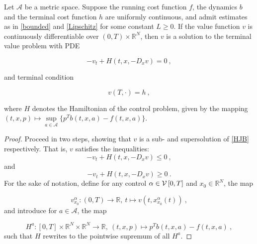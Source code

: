

\begin{theorem}
	\label{classical solution HJB}
	Let $ \mathcal{A} $ be a metric space. Suppose the running cost function $ f $, the dynamics $ b $ and the terminal cost function $ h $ are uniformly continuous, and admit estimates as in \eqref{bounded} and \eqref{Lipschitz} for some constant $ L \geq 0 $. If the value function $ v $ is continuously differentiable over $ \left( 0, T \right) \times \mathbb{R}^N $, then $ v $ is a solution to the terminal value problem with PDE
	
	\begin{equation}
		\label{HJB}
		-v_t + H(t, x, -D_x v) = 0 \ ,
	\end{equation}
	
	and terminal condition
	
	\begin{equation}
		\label{boundary}
		v(T, \cdot) = h \ ,
	\end{equation}
	
	where $ H $ denotes the Hamiltonian of the control problem, given by the mapping $ (t, x, p) \mapsto \sup\limits_{a \in \mathcal{A}} \bigg\{ p^{T} b(t, x, a) - f(t, x, a) \bigg\} $.
	\begin{proof}
		Proceed in two steps, showing that $ v $ is a sub- and supersolution of \eqref{HJB} respectively. That is, $ v $ satisfies the inequalities:
		\begin{equation}
			\label{value_subsolution}
			-v_t + H(t, x, -D_x v) \leq 0 \ ,
		\end{equation}
		and 
		\begin{equation}
			\label{value_supersolution}
			-v_t + H(t, x, - D_x v) \geq 0 \ .
		\end{equation}
		For the sake of notation, define for any control $ \alpha \in \mathcal{V}\left[ {0}, T \right] $ and $ x_0 \in \mathbb{R}^N $, the map
		
		\begin{equation*}
			v^{\alpha}_{x_0} : \left( 0 , T \right) \to \mathbb{R}, \ t \mapsto v(t, x^{\alpha}_{x_0}(t)) \ ,
		\end{equation*}
		and introduce for $ a \in \mathcal{A} $, the map
		
		\begin{equation*}
			H^{a} : \left[ 0, T \right] \times \mathbb{R}^{N} \times \mathbb{R}^N \to \mathbb{R}, \ (t, x, p) \mapsto p^{T} b(t, x, a) - f(t, x, a) \ ,
		\end{equation*}
		such that $ H $ rewrites to the pointwise supremum of all $ H^{a} $.
		

\end{proof}
\end{theorem}
